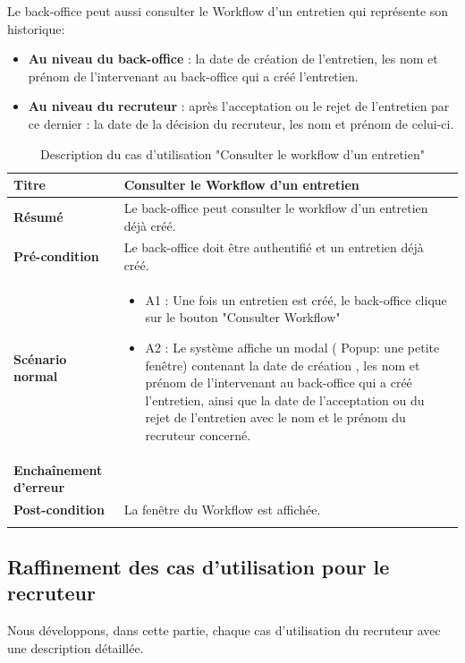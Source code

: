 Le back-office peut aussi consulter le Workflow d'un entretien qui représente son historique:
\begin{itemize}
    \item \textbf{Au niveau du back-office} : la date de création de l'entretien, les nom et prénom de l'intervenant au back-office qui a créé l'entretien.
    \item \textbf{Au niveau du recruteur} : après l'acceptation ou le rejet de l'entretien par ce dernier : la date de la décision du recruteur, les nom et prénom de celui-ci.
\end{itemize} 
\begin{longtable}[c]{
    |p{}|
    |p{}|
}
    \hline
    \textbf{Titre}
    &   Consulter le Workflow d'un entretien\\
    \hline
    \textbf{Résumé}
    & Le back-office peut consulter le workflow d'un entretien déjà créé. \\
    \hline
     \textbf{Pré-condition}
    & Le back-office doit être authentifié et un entretien déjà créé.\\
    \hline
     \textbf{Scénario normal}
    & \begin{itemize}
        \item A1 : Une fois un entretien est créé, le back-office clique sur le bouton "Consulter Workflow" 
        \item A2 : Le système affiche un modal ( Popup: une petite fenêtre) contenant la date de création , les nom et prénom de l'intervenant au back-office qui a créé l'entretien, ainsi que la date de l'acceptation ou du rejet de l'entretien avec le nom et le prénom du recruteur concerné.
    \end{itemize}\\
    \hline
    \textbf{Enchaînement d'erreur}
    & \\
    \hline
    \textbf{Post-condition}
    & La fenêtre du Workflow est affichée.\\
    \hline
\caption{Description du cas d'utilisation "Consulter le workflow d'un entretien"}
\label{tab:desc_consult_workflow}
\end{longtable} 
\subsection{Raffinement des cas d'utilisation pour le recruteur}
Nous développons, dans cette partie, chaque cas d'utilisation du recruteur avec une description détaillée.
